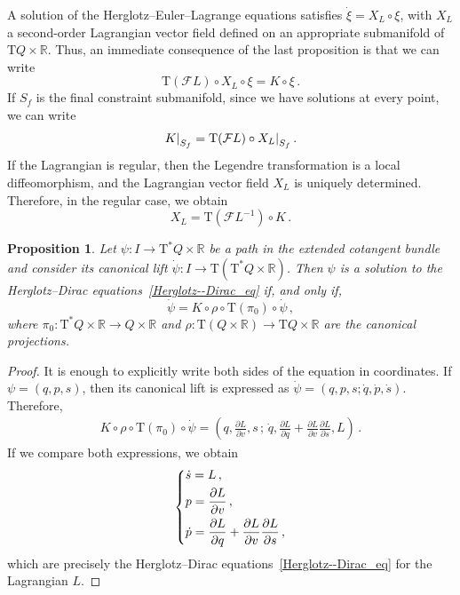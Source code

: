 \documentclass[11pt]{article}
\theoremstyle{plain}
\newtheorem{proposition}[theorem]{Proposition}
\theoremstyle{definition}
\newcommand\restr[2]{{%
  \left.\kern-\nulldelimiterspace %
  #1 %
  \right|_{#2} %
}}
\newcommand{\R}{\mathbb{R}}
\newcommand{\T}{{\mathrm T}}
\let\Tan\T
\newcommand{\parder}[2]{\frac{\partial #1}{\partial #2}}
\def\Tan{\mathrm{T}}
\def\FL{\mathcal{F} L}
\begin{document}
A solution of the Herglotz--Euler--Lagrange equations satisfies $\dot{\xi}= X_L\circ\xi$, with $X_L$ a second-order Lagrangian vector field defined on an appropriate submanifold of $\Tan Q \times \R$. Thus, an immediate consequence of the last proposition is that we can write
\begin{equation}
    \Tan(\FL) \circ X_L \circ \xi = K\circ \xi\,.
\end{equation}
If $S_f$ is the final constraint submanifold, since we have solutions at every point, we can write
\begin{equation}
    \restr{K}{S_f} = \Tan(\FL) \circ \restr{X_L}{S_f} \,.
\end{equation}
If the Lagrangian is regular, then the Legendre transformation is a local diffeomorphism, and the Lagrangian vector field $X_L$ is uniquely determined. Therefore, in the regular case, we obtain
\begin{equation}
    X_L=\Tan(\FL^{-1}) \circ K \,.
\end{equation}

\begin{proposition}\label{H-Dirac}
    Let $\psi\colon I\to \Tan^*Q \times \R$ be a path in the extended cotangent bundle and consider its canonical lift $\dot \psi \colon I\to \Tan(\Tan^*Q \times \R)$. Then $\psi$ is a solution to the Herglotz--Dirac equations~\eqref{Herglotz--Dirac_eq} if, and only if,
    \begin{equation}
        \dot \psi =  K \circ \rho \circ \Tan(\pi_0) \circ \dot \psi \,,
    \end{equation}
    where $\pi_0 \colon \Tan^* Q \times \R \to Q \times \R$ and $\rho\colon \Tan(Q\times \R) \to \Tan Q \times \R$ are the canonical projections.
\end{proposition}

\begin{proof}
    It is enough to explicitly write both sides of the equation in coordinates. If $\psi=(q,p,s)$, then its canonical lift is expressed as $\dot\psi=(q,p,s;\dot q, \dot p,\dot s)$. Therefore,
    \begin{align}
        K\circ \rho \circ \Tan(\pi_0) \circ \dot\psi = \left( q, \parder{L}{v},s\, ; \, \dot q,\parder{L}{q}+\parder{L}{v}\parder{L}{s},L  \right)\,.
    \end{align}
    If we compare both expressions, we obtain
    \begin{equation}
    \begin{dcases}
    \dot s = L\,,
    \\
     p=\parder{L}{v}\,,
    \\
    \dot p = \parder{L}{q} + \parder{L}{v} \parder{L}{s} \,,
    \end{dcases}
    \end{equation}
    which are precisely the Herglotz--Dirac equations~\ref{Herglotz--Dirac_eq} for the Lagrangian $L$.
\end{proof}
\end{document}
